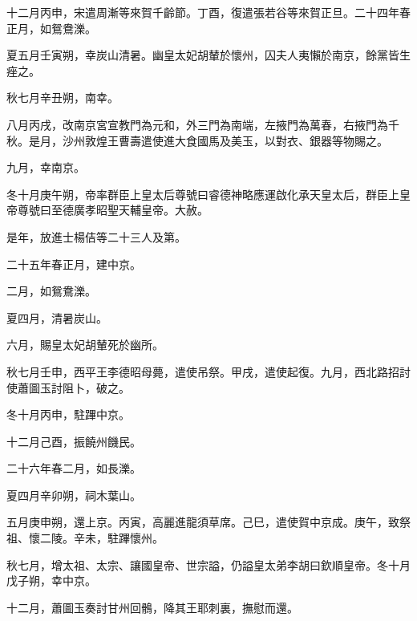 \begin{pinyinscope}
 十二月丙申，宋遣周漸等來賀千齡節。丁酉，復遣張若谷等來賀正旦。二十四年春正月，如鴛鴦濼。



 夏五月壬寅朔，幸炭山清暑。幽皇太妃胡輦於懷州，囚夫人夷懶於南京，餘黨皆生痤之。



 秋七月辛丑朔，南幸。



 八月丙戌，改南京宮宣教門為元和，外三門為南端，左掖門為萬春，右掖門為千
 秋。是月，沙州敦煌王曹壽遣使進大食國馬及美玉，以對衣、銀器等物賜之。



 九月，幸南京。



 冬十月庚午朔，帝率群臣上皇太后尊號曰睿德神略應運啟化承天皇太后，群臣上皇帝尊號曰至德廣孝昭聖天輔皇帝。大赦。



 是年，放進士楊佶等二十三人及第。



 二十五年春正月，建中京。



 二月，如鴛鴦濼。



 夏四月，清暑炭山。



 六月，賜皇太妃胡輦死於幽所。



 秋七月壬申，西平王李德昭母薨，遣使吊祭。甲戌，遣使起復。九月，西北路招討使蕭圖玉討阻卜，破之。



 冬十月丙申，駐蹕中京。



 十二月己酉，振饒州饑民。



 二十六年春二月，如長濼。



 夏四月辛卯朔，祠木葉山。



 五月庚申朔，還上京。丙寅，高麗進龍須草席。己巳，遣使賀中京成。庚午，致祭祖、懷二陵。辛未，駐蹕懷州。



 秋七月，增太祖、太宗、讓國皇帝、世宗謚，仍謚皇太弟李胡曰欽順皇帝。冬十月戊子朔，幸中京。



 十二月，蕭圖玉奏討甘州回鶻，降其王耶刺裏，撫慰而還。




\end{pinyinscope}
